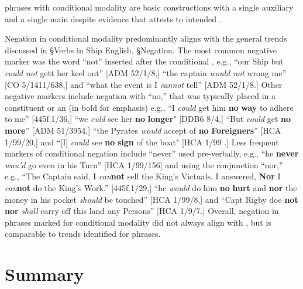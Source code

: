  phrases with conditional modality are basic constructions with a single auxiliary and a single main  despite evidence that attests to intended . 

  Negation in conditional modality predominantly aligns with the general trends discussed in §Verbs in Ship English, §Negation. The most common negative marker was the word “not” inserted after the conditional , e.g., “our Ship but \textit{could not} gett her keel out” [ADM 52/1/8,] “the captain \textit{would not} wrong me” [CO 5/1411/638,] and “what the event is I \textit{cannot} tell” [ADM 52/1/8.] Other negative markers include negation with “no,” that was typically placed in a  constituent or an  (in bold for emphasis) e.g., “I \textit{could} get him \textbf{no} \textbf{way} to adhere to me” [445f.1/36,] “we \textit{culd} see her \textbf{no} \textbf{longer}" [DDB6 8/4,] “But \textit{could} get \textbf{no} \textbf{more}” [ADM 51/3954,] “the Pyrates \textit{would} accept of \textbf{no} \textbf{Foreigners}” [HCA 1/99/20,] and “[I] \textit{could} see \textbf{no} \textbf{sign} of the boat" [HCA 1/99  \citealt{Islands1722}.] Less frequent markers of conditional negation include “never” used pre-verbally, e.g., “he \textbf{never} \textit{wou’d} go even in his Turn” [HCA 1/99/156] and  using the conjunction “nor,” e.g., “The Captain said, I \textit{can}\textbf{not} sell the King’s Victuals. I answered, \textbf{Nor} I \textit{can}\textbf{not} do the King’s Work.” [445f.1/29,] “he \textit{would} do him \textbf{no} \textbf{hurt} and \textbf{nor} the money in his pocket \textit{should} be touched” [HCA 1/99/8,] and “Capt Rigby doe \textbf{not} \textbf{nor} \textit{shall} carry off this land any Persons” [HCA 1/9/7.] Overall, negation in  phrases marked for conditional modality did not always align with , but is comparable to trends identified for  phrases. 

\section{{Summary}}%


